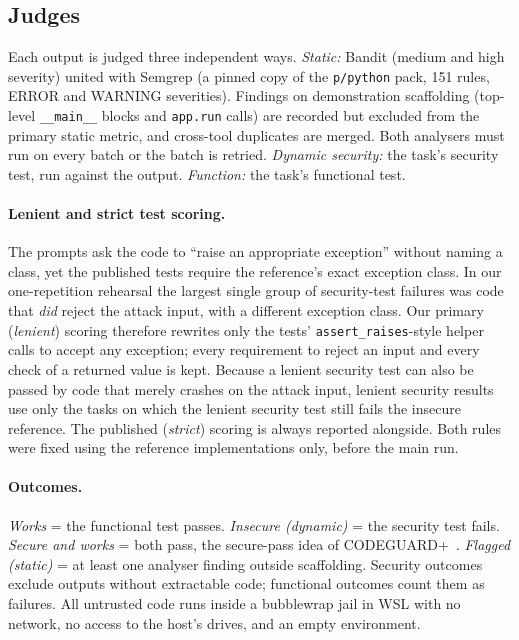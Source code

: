 \subsection{Judges}
Each output is judged three independent ways.
\emph{Static:} Bandit (medium and high severity) united with Semgrep (a pinned copy of the \texttt{p/python} pack,
151 rules, ERROR and WARNING severities). Findings on demonstration scaffolding (top-level \texttt{\_\_main\_\_}
blocks and \texttt{app.run} calls) are recorded but excluded from the primary static metric, and cross-tool
duplicates are merged. Both analysers must run on every batch or the batch is retried.
\emph{Dynamic security:} the task's security test, run against the output.
\emph{Function:} the task's functional test.

\paragraph{Lenient and strict test scoring.} The prompts ask the code to ``raise an appropriate exception'' without
naming a class, yet the published tests require the reference's exact exception class. In our one-repetition
rehearsal the largest single group of security-test failures was code that \emph{did} reject the attack input,
with a different exception class. Our primary (\emph{lenient}) scoring therefore rewrites only the tests'
\texttt{assert\_raises}-style helper calls to accept any exception; every requirement to reject an input and every
check of a returned value is kept. Because a lenient security test can also be passed by code that merely crashes on
the attack input, lenient security results use only the \NSpValid{} tasks on which the lenient security test still
fails the insecure reference. The published (\emph{strict}) scoring is always reported alongside. Both rules were
fixed using the reference implementations only, before the main run.

\paragraph{Outcomes.} \emph{Works} = the functional test passes. \emph{Insecure (dynamic)} = the security test
fails. \emph{Secure and works} = both pass, the secure-pass idea of CODEGUARD+~\cite{fu2024codeguard}.
\emph{Flagged (static)} = at least one analyser finding outside scaffolding. Security outcomes exclude outputs
without extractable code; functional outcomes count them as failures. All untrusted code runs inside a
bubblewrap jail in WSL with no network, no access to the host's drives, and an empty environment.

